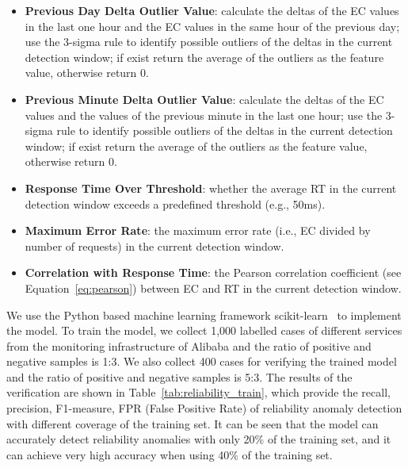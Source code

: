 \begin{itemize}
\item \textbf{Previous Day Delta Outlier Value}: calculate the deltas of the EC values in the last one hour and the EC values in the same hour of the previous day; use the 3-sigma rule to identify possible outliers of the deltas in the current detection window; if exist return the average of the outliers as the feature value, otherwise return 0.

\item \textbf{Previous Minute Delta Outlier Value}: 
calculate the deltas of the EC values and the values of the previous minute in the last one hour; 
use the 3-sigma rule to identify possible outliers of the deltas in the current detection window; 
if exist return the average of the outliers as the feature value, otherwise return 0.

\item \textbf{Response Time Over Threshold}: whether the average RT in the current detection window exceeds a predefined threshold (e.g., 50ms).

\item \textbf{Maximum Error Rate}: the maximum error rate (i.e., EC divided by number of requests) in the current detection window.

\item \textbf{Correlation with Response Time}: the Pearson correlation coefficient (see Equation~\ref{eq:pearson}) between EC and RT in the current detection window.

\end{itemize}

We use the Python based machine learning framework scikit-learn~\cite{scikitLearn} to implement the model.
To train the model, we collect 1,000 labelled cases of different services from the monitoring infrastructure of Alibaba and the ratio of positive and negative samples is 1:3.
We also collect 400 cases for verifying the trained model and the ratio of positive and negative samples is 5:3.
The results of the verification are shown in Table~\ref{tab:reliability_train}, which provide the recall, precision,
F1-measure, FPR (False Positive Rate) of reliability anomaly detection with different coverage of the training set.
It can be seen that the model can accurately detect reliability anomalies with only 20\% of the training set, and it can achieve very high accuracy when using 40\% of the training set.

